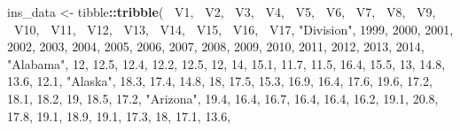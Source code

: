 \documentclass[
]{book}
\newenvironment{Shaded}{\begin{snugshade}}{\end{snugshade}}
\newcommand{\DecValTok}[1]{\textcolor[rgb]{0.00,0.00,0.81}{#1}}
\newcommand{\FloatTok}[1]{\textcolor[rgb]{0.00,0.00,0.81}{#1}}
\newcommand{\KeywordTok}[1]{\textcolor[rgb]{0.13,0.29,0.53}{\textbf{#1}}}
\newcommand{\NormalTok}[1]{#1}
\newcommand{\OperatorTok}[1]{\textcolor[rgb]{0.81,0.36,0.00}{\textbf{#1}}}
\newcommand{\StringTok}[1]{\textcolor[rgb]{0.31,0.60,0.02}{#1}}
\begin{document}
\begin{Shaded}
\begin{Highlighting}[]
\NormalTok{ins_data <-}\StringTok{ }\NormalTok{tibble}\OperatorTok{::}\KeywordTok{tribble}\NormalTok{(}
                     \OperatorTok{~}\NormalTok{V1,  }\OperatorTok{~}\NormalTok{V2,  }\OperatorTok{~}\NormalTok{V3,  }\OperatorTok{~}\NormalTok{V4,  }\OperatorTok{~}\NormalTok{V5,  }\OperatorTok{~}\NormalTok{V6,  }\OperatorTok{~}\NormalTok{V7,  }\OperatorTok{~}\NormalTok{V8,  }\OperatorTok{~}\NormalTok{V9, }\OperatorTok{~}\NormalTok{V10, }\OperatorTok{~}\NormalTok{V11, }\OperatorTok{~}\NormalTok{V12, }\OperatorTok{~}\NormalTok{V13, }\OperatorTok{~}\NormalTok{V14, }\OperatorTok{~}\NormalTok{V15, }\OperatorTok{~}\NormalTok{V16, }\OperatorTok{~}\NormalTok{V17,}
              \StringTok{"Division"}\NormalTok{, }\DecValTok{1999}\NormalTok{, }\DecValTok{2000}\NormalTok{, }\DecValTok{2001}\NormalTok{, }\DecValTok{2002}\NormalTok{, }\DecValTok{2003}\NormalTok{, }\DecValTok{2004}\NormalTok{, }\DecValTok{2005}\NormalTok{, }\DecValTok{2006}\NormalTok{, }\DecValTok{2007}\NormalTok{, }\DecValTok{2008}\NormalTok{, }\DecValTok{2009}\NormalTok{, }\DecValTok{2010}\NormalTok{, }\DecValTok{2011}\NormalTok{, }\DecValTok{2012}\NormalTok{, }\DecValTok{2013}\NormalTok{, }\DecValTok{2014}\NormalTok{,}
               \StringTok{"Alabama"}\NormalTok{,   }\DecValTok{12}\NormalTok{, }\FloatTok{12.5}\NormalTok{, }\FloatTok{12.4}\NormalTok{, }\FloatTok{12.2}\NormalTok{, }\FloatTok{12.5}\NormalTok{,   }\DecValTok{12}\NormalTok{,   }\DecValTok{14}\NormalTok{, }\FloatTok{15.1}\NormalTok{, }\FloatTok{11.7}\NormalTok{, }\FloatTok{11.5}\NormalTok{, }\FloatTok{16.4}\NormalTok{, }\FloatTok{15.5}\NormalTok{,   }\DecValTok{13}\NormalTok{, }\FloatTok{14.8}\NormalTok{, }\FloatTok{13.6}\NormalTok{, }\FloatTok{12.1}\NormalTok{,}
                \StringTok{"Alaska"}\NormalTok{, }\FloatTok{18.3}\NormalTok{, }\FloatTok{17.4}\NormalTok{, }\FloatTok{14.8}\NormalTok{,   }\DecValTok{18}\NormalTok{, }\FloatTok{17.5}\NormalTok{, }\FloatTok{15.3}\NormalTok{, }\FloatTok{16.9}\NormalTok{, }\FloatTok{16.4}\NormalTok{, }\FloatTok{17.6}\NormalTok{, }\FloatTok{19.6}\NormalTok{, }\FloatTok{17.2}\NormalTok{, }\FloatTok{18.1}\NormalTok{, }\FloatTok{18.2}\NormalTok{,   }\DecValTok{19}\NormalTok{, }\FloatTok{18.5}\NormalTok{, }\FloatTok{17.2}\NormalTok{,}
               \StringTok{"Arizona"}\NormalTok{, }\FloatTok{19.4}\NormalTok{, }\FloatTok{16.4}\NormalTok{, }\FloatTok{16.7}\NormalTok{, }\FloatTok{16.4}\NormalTok{, }\FloatTok{16.4}\NormalTok{, }\FloatTok{16.2}\NormalTok{, }\FloatTok{19.1}\NormalTok{, }\FloatTok{20.8}\NormalTok{, }\FloatTok{17.8}\NormalTok{, }\FloatTok{19.1}\NormalTok{, }\FloatTok{18.9}\NormalTok{, }\FloatTok{19.1}\NormalTok{, }\FloatTok{17.3}\NormalTok{,   }\DecValTok{18}\NormalTok{, }\FloatTok{17.1}\NormalTok{, }\FloatTok{13.6}\NormalTok{,}

\end{Highlighting}
\end{Shaded}
\end{document}
